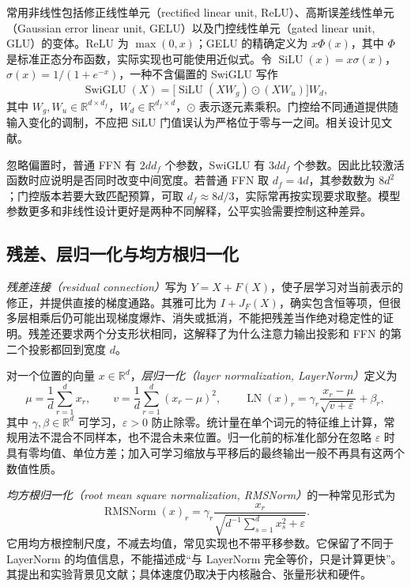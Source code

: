 \documentclass[UTF8,12pt,a4paper,fontset=fandol]{ctexart}
\begin{document}
常用非线性包括修正线性单元（rectified linear unit, ReLU）、高斯误差线性单元（Gaussian error linear unit, GELU）以及门控线性单元（gated linear unit, GLU）的变体。ReLU 为 $\max(0,x)$；GELU 的精确定义为 $x\Phi(x)$，其中 $\Phi$ 是标准正态分布函数，实际实现也可能使用近似式。令 $\operatorname{SiLU}(x)=x\sigma(x)$，$\sigma(x)=1/(1+e^{-x})$，一种不含偏置的 SwiGLU 写作
\begin{equation}
\operatorname{SwiGLU}(X)=
\bigl[\operatorname{SiLU}(XW_g)\odot(XW_u)\bigr]W_d,
\label{eq:tr-swiglu}
\end{equation}
其中 $W_g,W_u\in\mathbb R^{d\times d_f}$，$W_d\in\mathbb R^{d_f\times d}$，$\odot$ 表示逐元素乘积。门控给不同通道提供随输入变化的调制，不应把 SiLU 门值误认为严格位于零与一之间。相关设计见文献\cite{shazeer2020}。

忽略偏置时，普通 FFN 有 $2dd_f$ 个参数，SwiGLU 有 $3dd_f$ 个参数。因此比较激活函数时应说明是否同时改变中间宽度。若普通 FFN 取 $d_f=4d$，其参数数为 $8d^2$；门控版本若要大致匹配预算，可取 $d_f\approx8d/3$，实际常再按实现要求取整。模型参数更多和非线性设计更好是两种不同解释，公平实验需要控制这种差异。

\subsection{残差、层归一化与均方根归一化}

\emph{残差连接（residual connection）}写为 $Y=X+F(X)$，使子层学习对当前表示的修正，并提供直接的梯度通路。其雅可比为 $I+J_F(X)$，确实包含恒等项，但很多层相乘后仍可能出现梯度爆炸、消失或抵消，不能把残差当作绝对稳定性的证明。残差还要求两个分支形状相同，这解释了为什么注意力输出投影和 FFN 的第二个投影都回到宽度 $d$。

对一个位置的向量 $x\in\mathbb R^d$，\emph{层归一化（layer normalization, LayerNorm）}定义为
\begin{equation}
\mu=\frac1d\sum_{r=1}^d x_r,\qquad
v=\frac1d\sum_{r=1}^d(x_r-\mu)^2,\qquad
\operatorname{LN}(x)_r=\gamma_r\frac{x_r-\mu}{\sqrt{v+\varepsilon}}+\beta_r,
\label{eq:tr-ln}
\end{equation}
其中 $\gamma,\beta\in\mathbb R^d$ 可学习，$\varepsilon>0$ 防止除零。统计量在单个词元的特征维上计算，常规用法不混合不同样本，也不混合未来位置。归一化前的标准化部分在忽略 $\varepsilon$ 时具有零均值、单位方差；加入可学习缩放与平移后的最终输出一般不再具有这两个数值性质。

\emph{均方根归一化（root mean square normalization, RMSNorm）}的一种常见形式为
\begin{equation}
\operatorname{RMSNorm}(x)_r=
\gamma_r\frac{x_r}{\sqrt{d^{-1}\sum_{s=1}^d x_s^2+\varepsilon}}.
\label{eq:tr-rms}
\end{equation}
它用均方根控制尺度，不减去均值，常见实现也不带平移参数。它保留了不同于 LayerNorm 的均值信息，不能描述成“与 LayerNorm 完全等价，只是计算更快”。其提出和实验背景见文献\cite{zhang2019}；具体速度仍取决于内核融合、张量形状和硬件。
\end{document}
